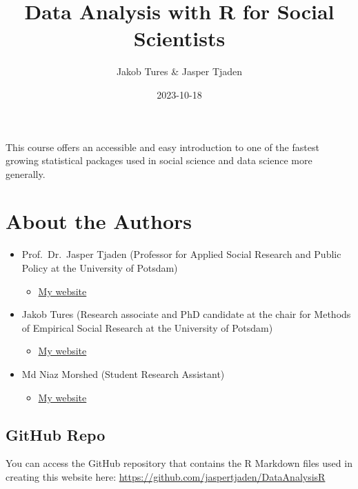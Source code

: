 \documentclass[
]{book}
\title{Data Analysis with R for Social Scientists}
\author{Jakob Tures \& Jasper Tjaden}
\date{2023-10-18}
\providecommand{\tightlist}{%
  \setlength{\itemsep}{0pt}\setlength{\parskip}{0pt}}
\begin{document}
\maketitle

{
\setcounter{tocdepth}{1}
\tableofcontents
}
This course offers an accessible and easy introduction to one of the fastest growing statistical packages used in social science and data science more generally.

\hypertarget{about-the-authors}{%
\chapter*{About the Authors}\label{about-the-authors}}

\begin{itemize}
\tightlist
\item
  Prof.~Dr.~Jasper Tjaden (Professor for Applied Social Research and Public Policy at the University of Potsdam)

  \begin{itemize}
  \tightlist
  \item
    \href{https://jaspertjaden.com}{My website}
  \end{itemize}
\item
  Jakob Tures (Research associate and PhD candidate at the chair for Methods of Empirical Social Research at the University of Potsdam)

  \begin{itemize}
  \tightlist
  \item
    \href{https://www.uni-potsdam.de/de/soziologie-methoden/team/jakob-tures}{My website}
  \end{itemize}
\item
  Md Niaz Morshed (Student Research Assistant)

  \begin{itemize}
  \tightlist
  \item
    \href{https://n1az.github.io/}{My website}
  \end{itemize}
\end{itemize}

\hypertarget{github-repo}{%
\section*{GitHub Repo}\label{github-repo}}

You can access the GitHub repository that contains the R Markdown files used in creating this website here: \url{https://github.com/jaspertjaden/DataAnalysisR}
\end{document}
